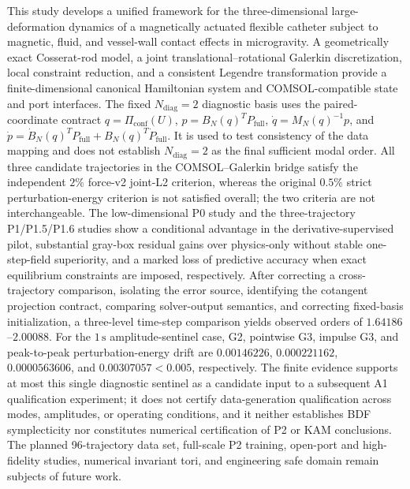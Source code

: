 This study develops a unified framework for the three-dimensional large-deformation dynamics of a magnetically actuated flexible catheter subject to magnetic, fluid, and vessel-wall contact effects in microgravity. A geometrically exact Cosserat-rod model, a joint translational--rotational Galerkin discretization, local constraint reduction, and a consistent Legendre transformation provide a finite-dimensional canonical Hamiltonian system and COMSOL-compatible state and port interfaces. The fixed \(N_{\mathrm{diag}}=2\) diagnostic basis uses the paired-coordinate contract \(q=\Pi_{\mathrm{conf}}(U)\), \(p=B_N(q)^{T}P_{\mathrm{full}}\), \(\dot q=M_N(q)^{-1}p\), and \(\dot p=\dot B_N(q)^{T}P_{\mathrm{full}}+B_N(q)^{T}\dot P_{\mathrm{full}}\). It is used to test consistency of the data mapping and does not establish \(N_{\mathrm{diag}}=2\) as the final sufficient modal order. All three candidate trajectories in the COMSOL--Galerkin bridge satisfy the independent \(2\%\) force-v2 joint-L2 criterion, whereas the original \(0.5\%\) strict perturbation-energy criterion is not satisfied overall; the two criteria are not interchangeable. The low-dimensional P0 study and the three-trajectory P1/P1.5/P1.6 studies show a conditional advantage in the derivative-supervised pilot, substantial gray-box residual gains over physics-only without stable one-step-field superiority, and a marked loss of predictive accuracy when exact equilibrium constraints are imposed, respectively. After correcting a cross-trajectory comparison, isolating the error source, identifying the cotangent projection contract, comparing solver-output semantics, and correcting fixed-basis initialization, a three-level time-step comparison yields observed orders of \(1.64186\)--\(2.00088\). For the \(1\,\mathrm{s}\) amplitude-sentinel case, G2, pointwise G3, impulse G3, and peak-to-peak perturbation-energy drift are \(0.00146226\), \(0.000221162\), \(0.0000563606\), and \(0.00307057<0.005\), respectively. The finite evidence supports at most this single diagnostic sentinel as a candidate input to a subsequent A1 qualification experiment; it does not certify data-generation qualification across modes, amplitudes, or operating conditions, and it neither establishes BDF symplecticity nor constitutes numerical certification of P2 or KAM conclusions. The planned 96-trajectory data set, full-scale P2 training, open-port and high-fidelity studies, numerical invariant tori, and engineering safe domain remain subjects of future work.
